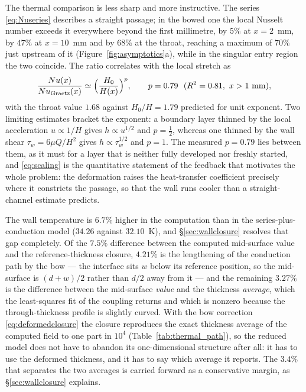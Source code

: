 \documentclass[11pt,a4paper]{article}
\begin{document}
The thermal comparison is less sharp and more instructive. The series \eqref{eq:Nuseries}
describes a straight passage; in the bowed one the local Nusselt number exceeds it
everywhere beyond the first millimetre, by $5\%$ at $x=2$~mm, by $47\%$ at $x=10$~mm and by
$68\%$ at the throat, reaching a maximum of $70\%$ just upstream of it
(Figure~\ref{fig:asymptotics}a), while in the singular entry region the two coincide. The
ratio correlates with the local stretch as
\begin{equation}
\frac{Nu(x)}{Nu_{\rm Graetz}(x)}\simeq\Bigl(\frac{H_0}{H(x)}\Bigr)^{p},\qquad
p=0.79\ \ (R^2=0.81,\ x>1\ \mathrm{mm}),
\label{eq:scaling}
\end{equation}
with the throat value $1.68$ against $H_0/H=1.79$ predicted for unit exponent. Two limiting
estimates bracket the exponent: a boundary layer thinned by the local acceleration
$u\propto1/H$ gives $h\propto u^{1/2}$ and $p=\tfrac12$, whereas one thinned by the wall
shear $\tau_w=6\mu Q/H^2$ gives $h\propto\tau_w^{1/2}$ and $p=1$. The measured $p=0.79$ lies
between them, as it must for a layer that is neither fully developed nor freshly started, and
\eqref{eq:scaling} is the quantitative statement of the feedback that motivates the whole
problem: the deformation raises the heat-transfer coefficient precisely where it constricts
the passage, so that the wall runs cooler than a straight-channel estimate predicts.

The wall temperature is $6.7\%$ higher in the computation than in the series-plus-conduction
model ($34.26$ against $32.10$~K), and \S\ref{sec:wallclosure} resolves that gap completely.
Of the $7.5\%$ difference between the computed mid-surface value and the reference-thickness
closure, $4.21\%$ is the lengthening of the conduction path by the bow --- the interface sits
$w$ below its reference position, so the mid-surface is $(d+w)/2$ rather than $d/2$ away from
it --- and the remaining $3.27\%$ is the difference between the mid-surface \emph{value} and
the thickness \emph{average}, which the least-squares fit of the coupling returns and which is
nonzero because the through-thickness profile is slightly curved. With the bow correction
\eqref{eq:deformedclosure} the closure reproduces the exact thickness average of the computed
field to one part in $10^{4}$ (Table~\ref{tab:thermal_path}), so the reduced model does not
have to abandon its one-dimensional structure after all: it has to use the deformed thickness,
and it has to say which average it reports. The $3.4\%$ that separates the two averages is
carried forward as a conservative margin, as \S\ref{sec:wallclosure} explains.
\end{document}
